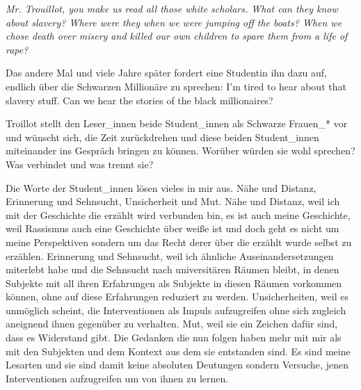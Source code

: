 \begin{myenv}
  \textit{ \glqq Mr. Trouillot, you make us read all those white scholars. What can
    they know about slavery? Where were they when we were jumping off the boats?
    When we chose death over misery and killed our own children to spare them from a
  life of rape? \grqq} \footnotemark {}  
\end{myenv}

Das andere Mal und viele Jahre später fordert eine Studentin ihn dazu auf, 
endlich über die Schwarzen Millionäre zu sprechen: 
\glqq I'm tired to hear about that slavery stuff. Can we hear the stories of the
black millionaires? \grqq \footnotemark {}   

Troillot stellt den Leser\_innen beide Student\_innen als Schwarze Frauen\_* vor
und wünscht sich, die Zeit zurückdrehen und diese beiden Student\_innen
miteinander ins Gespräch bringen zu können. Worüber würden sie wohl sprechen?
Was verbindet und was trennt sie?

Die Worte der Student\_innen lösen vieles in mir aus. Nähe und Distanz,
Erinnerung und Sehnsucht, Unsicherheit und Mut. Nähe und Distanz, weil ich mit
der Geschichte die erzählt wird verbunden bin, es ist auch meine Geschichte,
weil Rassismus auch eine Geschichte über weiße ist und doch geht es nicht um
meine Perspektiven sondern um das Recht derer über die erzählt wurde selbst zu
erzählen. Erinnerung und Sehnsucht, weil ich ähnliche Auseinandersetzungen
miterlebt habe und die Sehnsucht nach universitären Räumen bleibt, in denen
Subjekte mit all ihren Erfahrungen als Subjekte in diesen Räumen vorkommen
können, ohne auf diese Erfahrungen reduziert zu werden. Unsicherheiten, weil es
unmöglich scheint, die Interventionen als Impuls aufzugreifen ohne sich zugleich
aneignend ihnen gegenüber zu verhalten. Mut, weil sie ein Zeichen dafür sind,
dass es Widerstand gibt.  Die Gedanken die nun folgen haben mehr mit mir als mit
den Subjekten und dem Kontext aus dem sie entstanden sind. Es sind meine
Lesarten und sie sind damit keine absoluten Deutungen sondern Versuche, jenen
Interventionen aufzugreifen um von ihnen zu lernen. 

